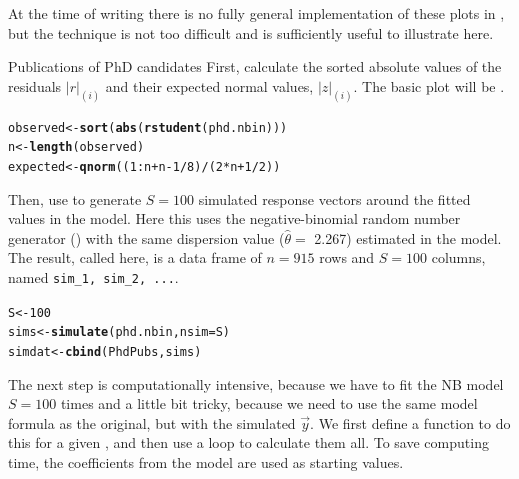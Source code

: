 \documentclass[11pt]{book}\usepackage[]{graphicx}\usepackage[]{color}
\makeatletter
\newcommand{\hlnum}[1]{\textcolor[rgb]{0.686,0.059,0.569}{#1}}%
\newcommand{\hlopt}[1]{\textcolor[rgb]{0,0,0}{#1}}%
\newcommand{\hlstd}[1]{\textcolor[rgb]{0.345,0.345,0.345}{#1}}%
\newcommand{\hlkwb}[1]{\textcolor[rgb]{0.69,0.353,0.396}{#1}}%
\newcommand{\hlkwc}[1]{\textcolor[rgb]{0.333,0.667,0.333}{#1}}%
\newcommand{\hlkwd}[1]{\textcolor[rgb]{0.737,0.353,0.396}{\textbf{#1}}}%
\newenvironment{kframe}{%
 \def\at@end@of@kframe{}%
 \ifinner\ifhmode%
  \def\at@end@of@kframe{\end{minipage}}%
  \begin{minipage}{\columnwidth}%
 \fi\fi%
 \def\FrameCommand##1{\hskip\@totalleftmargin \hskip-\fboxsep
 \colorbox{shadecolor}{##1}\hskip-\fboxsep
     \hskip-\linewidth \hskip-\@totalleftmargin \hskip\columnwidth}%
 \MakeFramed {\advance\hsize-\width
   \@totalleftmargin\z@ \linewidth\hsize
   \@setminipage}}%
 {\par\unskip\endMakeFramed%
 \at@end@of@kframe}
\newenvironment{knitrout}{}{} %
\renewenvironment{knitrout}{\small\renewcommand{\baselinestretch}{.85}}{} %
\makeatother
\begin{document}
At the time of writing there is no fully general implementation of these plots in \R,
but the technique is not too difficult and is sufficiently useful to illustrate here.

\begin{Example}[phdpubs6]{Publications of PhD candidates}
First, calculate the sorted absolute values of the residuals $|r|_{(i)}$ and
their expected normal values, $|z|_{(i)}$.  The basic plot will be
.
\begin{knitrout}
\color{fgcolor}\begin{kframe}
\begin{alltt}
\hlstd{observed} \hlkwb{<-} \hlkwd{sort}\hlstd{(}\hlkwd{abs}\hlstd{(}\hlkwd{rstudent}\hlstd{(phd.nbin)))}
\hlstd{n} \hlkwb{<-} \hlkwd{length}\hlstd{(observed)}
\hlstd{expected} \hlkwb{<-} \hlkwd{qnorm}\hlstd{((}\hlnum{1}\hlopt{:}\hlstd{n} \hlopt{+} \hlstd{n} \hlopt{-} \hlnum{1}\hlopt{/}\hlnum{8}\hlstd{)}\hlopt{/}\hlstd{(}\hlnum{2}\hlopt{*}\hlstd{n} \hlopt{+} \hlnum{1}\hlopt{/}\hlnum{2}\hlstd{))}
\end{alltt}
\end{kframe}
\end{knitrout}
Then, use  to generate $S=100$ simulated response vectors around the fitted
values in the model. Here this uses the negative-binomial random number generator ()
with the same dispersion value ($\widehat{\theta} =$ 2.267)
estimated in the model.  The result, called  here, is a data frame of
$n=915$ rows and $S=100$ columns, named \verb|sim_1, sim_2, ...|.
\begin{knitrout}
\color{fgcolor}\begin{kframe}
\begin{alltt}
\hlstd{S} \hlkwb{<-} \hlnum{100}
\hlstd{sims} \hlkwb{<-} \hlkwd{simulate}\hlstd{(phd.nbin,} \hlkwc{nsim}\hlstd{=S)}
\hlstd{simdat} \hlkwb{<-} \hlkwd{cbind}\hlstd{(PhdPubs, sims)}
\end{alltt}
\end{kframe}
\end{knitrout}
The next step is computationally intensive, because we have to fit the NB model $S=100$ times
and a little bit tricky, because we need to use the same model formula as the original,
but with the simulated $\vec{y}$.
We first define a function  to do this for a given ,
and then use a loop to calculate them all. To save computing time, the
coefficients from the  model are used as starting values.

\end{Example}
\end{document}
